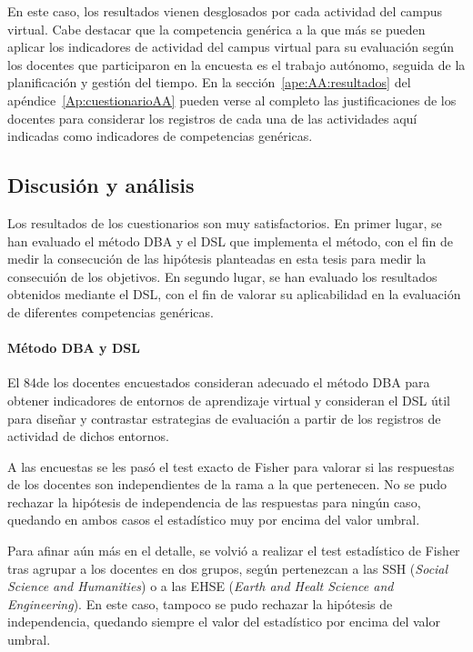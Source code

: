 En este caso, los resultados vienen desglosados por cada actividad del campus virtual. Cabe destacar que la competencia genérica a la que más se pueden aplicar los indicadores de actividad del campus virtual para su evaluación según los docentes que participaron en la encuesta es el trabajo autónomo, seguida de la planificación y gestión del tiempo. En la sección~\ref{ape:AA:resultados} del apéndice~\ref{Ap:cuestionarioAA} pueden verse al completo las justificaciones de los docentes para considerar los registros de cada una de las actividades aquí indicadas como indicadores de competencias genéricas.

\subsection{Discusión y análisis}

Los resultados de los cuestionarios son muy satisfactorios. En primer lugar, se han evaluado el método DBA y el DSL que implementa el método, con el fin de medir la consecución de las hipótesis planteadas en esta tesis para medir la consecuión de los objetivos. En segundo lugar, se han evaluado los resultados obtenidos mediante el DSL, con el fin de valorar su aplicabilidad en la evaluación de diferentes competencias genéricas.

\paragraph*{Método DBA y DSL}
El 84\percentage de los docentes encuestados consideran adecuado el método DBA para obtener indicadores de entornos de aprendizaje virtual y consideran el DSL útil para diseñar y contrastar estrategias de evaluación a partir de los registros de actividad de dichos entornos. 

A las encuestas se les pasó el test exacto de Fisher para valorar si las respuestas de los docentes son independientes de la rama a la que pertenecen. No se pudo rechazar la hipótesis de independencia de las respuestas para ningún caso, quedando en ambos casos el estadístico muy por encima del valor umbral.

Para afinar aún más en el detalle, se volvió a realizar el test estadístico de Fisher tras agrupar a los docentes en dos grupos, según pertenezcan a las SSH (\emph{Social Science and Humanities}) o a las EHSE (\emph{Earth and Healt Science and Engineering}). En este caso, tampoco se pudo rechazar la hipótesis de independencia, quedando siempre el valor del estadístico por encima del valor umbral.


